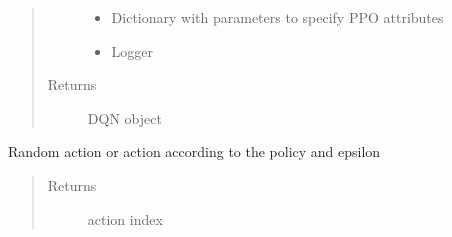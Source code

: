 \documentclass[letterpaper,10pt,english]{sphinxmanual}
\begin{document}
\begin{fulllineitems}
\begin{fulllineitems}
\begin{quote}
\begin{description}
\begin{itemize}
\item {} 
\sphinxAtStartPar
{} \textendash{} Dictionary with parameters to specify PPO attributes

\item {} 
\sphinxAtStartPar
{} \textendash{} Logger

\end{itemize}

\item[{Returns}] \leavevmode
\sphinxAtStartPar
DQN object

\end{description}\end{quote}

\end{fulllineitems}


\begin{fulllineitems}
\label{\detokenize{agents.reinforcement_learning:agents.reinforcement_learning.dqn.DQN.get_action}}
\sphinxAtStartPar
Random action or action according to the policy and epsilon
\begin{quote}\begin{description}
\item[{Returns}] \leavevmode
\sphinxAtStartPar
action index

\end{description}\end{quote}

\end{fulllineitems}



\end{fulllineitems}
\end{document}
